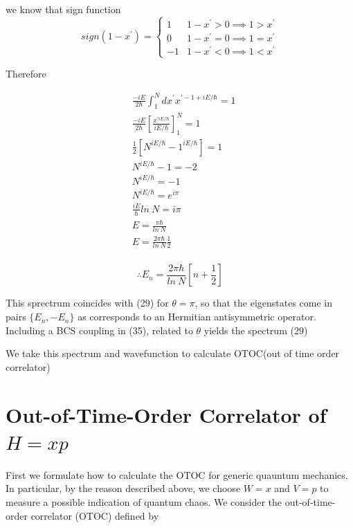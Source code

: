 \documentclass[12pt, letterpaper]{article}
\newcommand*{\1}{\hspace{1pt}}
\begin{document}
        we know that sign function
        \[ sign(1-x^{'}) = \begin{cases} 
            1 & 1-x^{'} > 0  \implies 1 > x^{'} \\
            0 & 1-x^{'} = 0 \implies 1=x^{'} \\
            -1 & 1-x^{'} < 0 \implies 1<x^{'} 
         \end{cases}
      \]

        Therefore

        \begin{align*}
            &\frac{-iE}{2\hbar}\int _{1}^{N} dx^{'} x^{' -1+iE/\hbar} = 1 \\
            &\frac{-iE}{2\hbar} \left[\frac{x^{'iE/\hbar}}{iE/\hbar}\right] _{1} ^{N} = 1 \\
            &\frac{1}{2} \left[N^{iE/\hbar} - 1^{iE/\hbar}\right] = 1 \\
            &N^{iE/\hbar} - 1 = -2 \\ 
            &N^{iE/\hbar} = -1 \\ 
            &N^{iE/\hbar} = e^{i\pi} \\ 
            &\frac{iE}{\hbar}ln\ N = i\pi \\ 
            &E = \frac{\pi\hbar}{ln\ N} \\ 
            &E = \frac{2\pi\hbar}{ln\ N}\frac{1}{2} \\  
        \end{align*}

        \begin{equation}
            \therefore E_{n} = \frac{2\pi\hbar}{ln\ N}\left[n + \frac{1}{2}\right] 
        \end{equation}

        This sprectrum coincides with (29) for $\theta=\pi$, so that the eigenstates come in pairs $\{E_{n}, -E_{n}\}$ as corresponds to an Hermitian antisymmetric
        operator. Including a BCS coupling in (35), related to $\theta$ yields the spectrum (29)\cite{s9}

        We take this spectrum and wavefunction to calculate OTOC(out of time order correlator)

    \section{Out-of-Time-Order Correlator of $H=xp$}
        
        First we formulate how to calculate the OTOC for generic quauntum mechanics. In particular, by the reason described above, we choose $W = x$ and $V = p$ to measure
        a possible indication of quantum chaos. We consider the out-of-time-order correlator (OTOC) defined by
\end{document}
